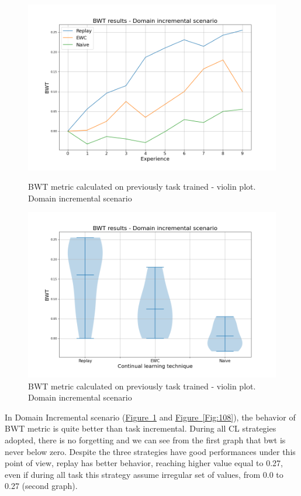 \documentclass[english, LaM, oneside]{sapthesis}%
\begin{document}
\begin{figure}[h]
   \begin{minipage}{0.48\textwidth}
     \centering
     \includegraphics[width=1.1\linewidth]{overview_bwt_ni.png}
     \caption{BWT metric calculated on previously task trained - violin plot. Domain incremental scenario}\label{Fig:116}
   \end{minipage}\hfill
   \begin{minipage}{0.48\textwidth}
     \centering
     \includegraphics[width=1.1\linewidth]{overview2_bwt_ni.png}
     \caption{BWT metric calculated on previously task trained - violin plot. Domain incremental scenario}\label{Fig:117}
   \end{minipage}
\end{figure}
In Domain Incremental scenario (\hyperref[Fig:116]{Figure~\ref*{Fig:117}} and \hyperref[Fig:108]{Figure~\ref*{Fig:108}}), the behavior of BWT metric is quite better than task incremental. During all CL strategies adopted, there is no forgetting and we can see from the first graph that bwt is never below zero. Despite the three strategies have good performances under this point of view, replay has better behavior, reaching higher value equal to 0.27, even if during all task this strategy assume irregular set of values, from 0.0 to 0.27 (second graph).
\end{document}
